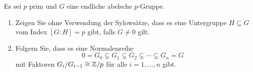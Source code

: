 \begin{question}[subtitle={Elemente von Ordnung $p$ in $p$-Gruppen}]
  Es sei $p$ prim und $G$ eine endliche abelsche $p$-Gruppe.
  \begin{enumerate}
    \item
      Zeigen Sie ohne Verwendung der Sylowsätze, dass es eine Untergruppe $H \subseteq G$ vom Index $[G : H] = p$ gibt, falls $G \neq 0$ gilt.
    \item
      Folgern Sie, dass es eine Normalenreihe
      \[
                    0
        =           G_0
        \subsetneq  G_1
        \subsetneq  G_2
        \subsetneq  \dotsb
        \subsetneq  G_n
        =           G
      \]
      mit Faktoren $G_i/G_{i-1} \cong \mathbb{Z}/p$ für alle $i = 1, \dotsc, n$ gibt.
  \end{enumerate}
\end{question}


